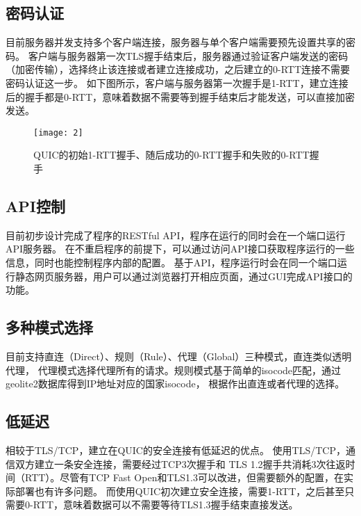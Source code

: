 \vspace{3mm}
\subsection{密码认证}
目前服务器并发支持多个客户端连接，服务器与单个客户端需要预先设置共享的密码。
客户端与服务器第一次TLS握手结束后，服务器通过验证客户端发送的密码（加密传输），选择终止该连接或者建立连接成功，之后建立的0-RTT连接不需要密码认证这一步。
如下图所示，客户端与服务器第一次握手是1-RTT，建立连接后的握手都是0-RTT，意味着数据不需要等到握手结束后才能发送，可以直接加密发送。

\begin{figure}[h]
  \centering
  \texttt{[image: 2]}
  \caption{QUIC的初始1-RTT握手、随后成功的0-RTT握手和失败的0-RTT握手}
  \label{fig:1}
\end{figure}

\vspace{3mm}
\subsection{API控制}
目前初步设计完成了程序的RESTful API，程序在运行的同时会在一个端口运行API服务器。
在不重启程序的前提下，可以通过访问API接口获取程序运行的一些信息，同时也能控制程序内部的配置。
基于API，程序运行时会在同一个端口运行静态网页服务器，用户可以通过浏览器打开相应页面，通过GUI完成API接口的功能。

\vspace{3mm}
\subsection{多种模式选择}
目前支持直连（Direct）、规则（Rule）、代理（Global）三种模式，直连类似透明代理，
代理模式选择代理所有的请求。规则模式基于简单的isocode匹配，通过geolite2数据库得到IP地址对应的国家isocode，
根据作出直连或者代理的选择。

\vspace{3mm}
\subsection{低延迟}
相较于TLS/TCP，建立在QUIC的安全连接有低延迟的优点。
使用TLS/TCP，通信双方建立一条安全连接，需要经过TCP3次握手和
TLS 1.2握手共消耗3次往返时间（RTT）。尽管有TCP Fast Open\cite{radhakrishnan2011tcp}和TLS1.3可以改进，但需要额外的配置，在实际部署也有许多问题。
而使用QUIC初次建立安全连接，需要1-RTT，之后甚至只需要0-RTT，意味着数据可以不需要等待TLS1.3握手结束直接发送。


